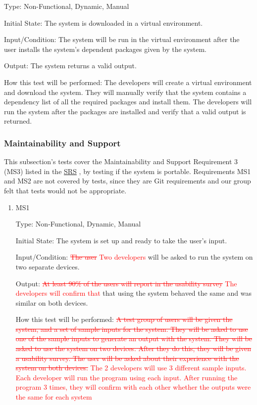 \documentclass[12pt, titlepage]{article}
\begin{document}
\begin{enumerate}
Type: Non-Functional, Dynamic, Manual
					
Initial State: 
The system is downloaded in a virtual environment.

Input/Condition: 
The system will be run in the virtual environment after the user installs the system's dependent packages given by the system.

Output: 
The system returns a valid output.

How this test will be performed: 
The developers will create a virtual environment and download the system. They will manually verify that the system contains a dependency list of all the required packages and install them. The developers will run the system after the packages are installed and verify that a valid output is returned.

\end{enumerate}

\subsubsection{Maintainability and Support}
This subsection's tests cover the Maintainability and Support Requirement 3 (MS3) listed in the \href{https://github.com/paezha/PyERT-BLACK/blob/main/docs/SRS/SRS.pdf}{SRS} \citep{SRS}, by testing if the system is portable. Requirements MS1 and MS2 are not covered by tests, since they are Git requirements and our group felt that tests would not be appropriate.

\begin{enumerate}

\item{MS1\\}\label{MS1}

Type: Non-Functional, Dynamic, Manual
					
Initial State: 
The system is set up and ready to take the user's input.

Input/Condition: 
\textcolor{red}{\sout{The user} Two developers} will be asked to run the system on two separate devices.

Output: 
\textcolor{red}{\sout{At least 90\% of the users will report in the usability survey} The developers will confirm that} that using the system behaved the same and was similar on both devices.

How this test will be performed: 
\textcolor{red}{\sout{A test group of users will be given the system, and a set of sample inputs for the system. They will be asked to use one of the sample inputs to generate an output with the system. They will be asked to use the system on two devices. After they do this, they will be given a usability survey. The user will be asked about their experience with the system on both devices.} The 2 developers will use 3 different sample inputs. Each developer will run the program using each input. After running the program 3 times, they will confirm with each other whether the outputs were the same for each system} 

\end{enumerate}
\end{document}
